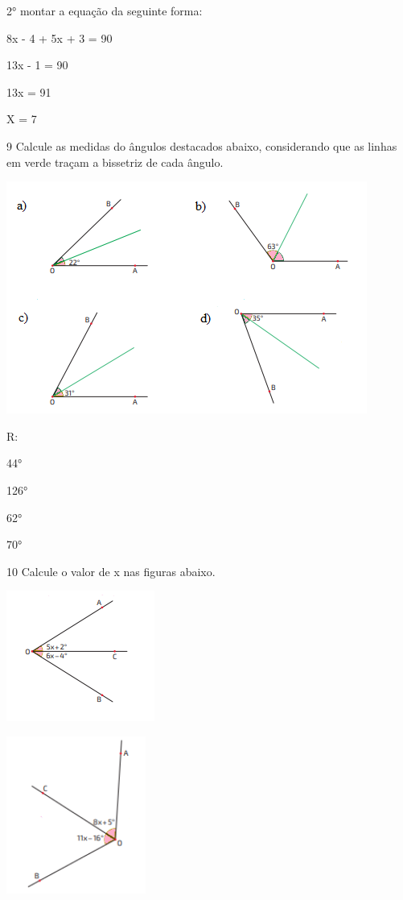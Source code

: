{2° montar a equação da seguinte forma:

8x - 4 + 5x + 3 = 90

13x - 1 = 90

13x = 91

X = 7

\num{9} Calcule as medidas do ângulos destacados abaixo, considerando que as
linhas em verde traçam a bissetriz de cada ângulo.

\includegraphics[width=4.66667in,height=3in]{./imgSAEB_8_MAT/media/image32.png}

R:
\item 44°
\item 126°
\item 62°
\item 70°

\num{10} Calcule o valor de x nas figuras abaixo.
\item
\includegraphics[width=1.91667in,height=1.6875in]{./imgSAEB_8_MAT/media/image33.png}
\item
\includegraphics[width=1.80208in,height=2.02917in]{./imgSAEB_8_MAT/media/image34.png}

}
